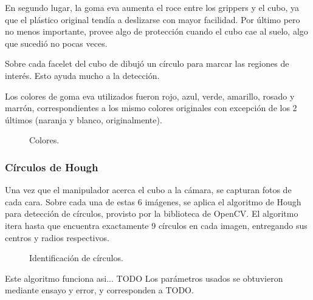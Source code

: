 En segundo lugar, la goma eva aumenta el roce entre los grippers y el cubo, ya que el plástico original tendía a deslizarse con mayor facilidad. Por último pero no menos importante, provee algo de protección cuando el cubo cae al suelo, algo que sucedió no pocas veces.

Sobre cada facelet del cubo de dibujó un círculo para marcar las regiones de interés. Esto ayuda mucho a la detección.

Los colores de goma eva utilizados fueron rojo, azul, verde, amarillo, rosado y marrón, correspondientes a los mismo colores originales con excepción de los 2 últimos (naranja y blanco, originalmente).

\begin{figure}[h!]
	\centering
	\caption{Colores.}
	\label{colorescubo}
\end{figure}

\subsubsection{Círculos de Hough}
Una vez que el manipulador acerca el cubo a la cámara, se capturan fotos de cada cara. Sobre cada una de estas 6 imágenes, se aplica el algoritmo de Hough para detección de círculos, provisto por la biblioteca de OpenCV. El algoritmo itera hasta que encuentra exactamente 9 círculos en cada imagen, entregando sus centros y radios respectivos.

\begin{figure}[h!]
	\centering
	\caption{Identificación de círculos.}
	\label{circulos}
\end{figure}
Este algoritmo funciona asi... TODO
Los parámetros usados se obtuvieron mediante ensayo y error, y corresponden a TODO.

